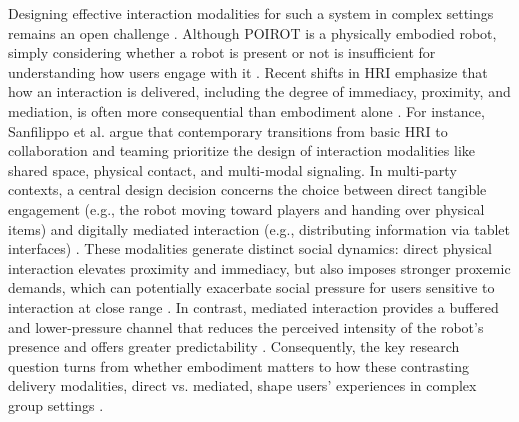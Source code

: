 \documentclass[sigconf,screen]{acmart-tagged}
\begin{document}
Designing effective interaction modalities for such a system in complex settings remains an open challenge \cite{tsai2025assistive, azevedo2024comfort, 9613601}. Although POIROT is a physically embodied robot, simply considering whether a robot is present or not is insufficient for understanding how users engage with it \cite{tsai2025assistive, sanfilippo2025caged, lagomarsino2023maximising, takayama2009influences}. Recent shifts in HRI emphasize that how an interaction is delivered, including the degree of immediacy, proximity, and mediation, is often more consequential than embodiment alone \cite{tsai2025assistive, jung2025proximity, Su2023RecentAI}. For instance, Sanfilippo et al. argue that contemporary transitions from basic HRI to collaboration and teaming prioritize the design of interaction modalities like shared space, physical contact, and multi-modal signaling. In multi-party contexts, a central design decision concerns the choice between direct tangible engagement (e.g., the robot moving toward players and handing over physical items) and digitally mediated interaction (e.g., distributing information via tablet interfaces) \cite{nigro2025social, han2024co, tan2022group}. These modalities generate distinct social dynamics: direct physical interaction elevates proximity and immediacy, but also imposes stronger proxemic demands, which can potentially exacerbate social pressure for users sensitive to interaction at close range \cite{tsai2025assistive, mead2015proxemics, mumm2011human, rajamohan2019factors}. In contrast, mediated interaction provides a buffered and lower-pressure channel that reduces the perceived intensity of the robot's presence and offers greater predictability \cite{pandey2025integrating, gittens2024remote, han2024co}. Consequently, the key research question turns from whether embodiment matters to how these contrasting delivery modalities, direct vs. mediated, shape users' experiences in complex group settings \cite{kabacinska2025influence, esterwood2025virtually, gillet2021robot, han2024co}.
\end{document}
